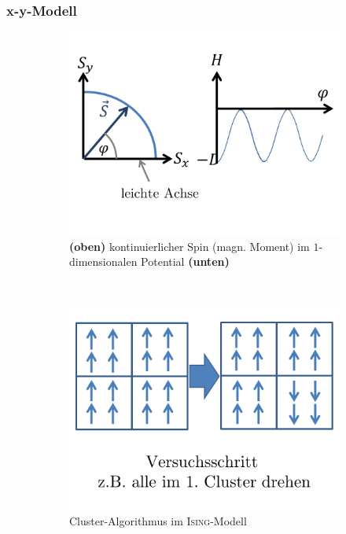 \documentclass[12pt]{article}
\begin{document}
\subsubsection{x-y-Modell}
\begin{figure}[h] 
		\begin{subfigure}[h]{0.5 \textwidth}
		\centering
		\includegraphics[width=\textwidth]{Folie45.png}
		\caption{\textbf{(oben)} kontinuierlicher Spin (magn. Moment)   im $1$-dimensionalen Potential \textbf{(unten)}} 
		\label{fig:Spin_Potential}
		\centering
	\end{subfigure}
	~
\begin{subfigure}[h]{0.5\textwidth}
		\centering
		\includegraphics[width=\textwidth]{Folie46.png}
		\caption{Cluster-Algorithmus im \textsc{Ising}-Modell}
		\label{fig:Cluster_Ising}
		\centering
	\end{subfigure}
	\caption{} %
\end{figure}	
\end{document}
